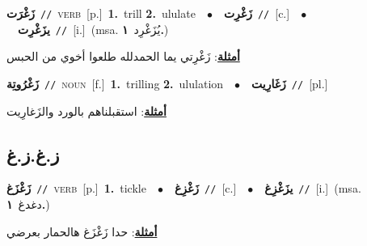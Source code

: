 \documentclass[10pt,a4paper,twoside]{article} %
\begin{document}
\begin{multicols}{2}
{\setlength\topsep{0pt}\textbf{\foreignlanguage{arabic}{زَغْرَت}}\ {\color{gray}\texttt{//}\color{black}}\ \textsc{verb}\ [p.]\ \textbf{1.}~trill  \textbf{2.}~ululate\ \ $\bullet$\ \ \setlength\topsep{0pt}\textbf{\foreignlanguage{arabic}{زَغْرِت}}\ {\color{gray}\texttt{//}\color{black}}\ [c.]\ \ $\bullet$\ \ \setlength\topsep{0pt}\textbf{\foreignlanguage{arabic}{يزَغْرِت}}\ {\color{gray}\texttt{//}\color{black}}\ [i.]\ \color{gray}(msa. \foreignlanguage{arabic}{يُزَغْرِد}~\foreignlanguage{arabic}{\textbf{١.}})\color{black}\  \begin{flushright}\color{gray}\foreignlanguage{arabic}{\textbf{\underline{\foreignlanguage{arabic}{أمثلة}}}: زَغْرِتي يما الحمدلله طلعوا أخوي من الحبس}\end{flushright}\color{black}} \vspace{2mm}

{\setlength\topsep{0pt}\textbf{\foreignlanguage{arabic}{زَغْرُوتِة}}\ {\color{gray}\texttt{//}\color{black}}\ \textsc{noun}\ [f.]\ \textbf{1.}~trilling  \textbf{2.}~ululation\ \ $\bullet$\ \ \setlength\topsep{0pt}\textbf{\foreignlanguage{arabic}{زَغَارِيت}}\ {\color{gray}\texttt{//}\color{black}}\ [pl.]\  \begin{flushright}\color{gray}\foreignlanguage{arabic}{\textbf{\underline{\foreignlanguage{arabic}{أمثلة}}}: استقبلناهم بالورد والزَغارِيت}\end{flushright}\color{black}} \vspace{2mm}

\vspace{-3mm}
\subsection*{\color{blue}\foreignlanguage{arabic}{ز.غ.ز.غ}\color{blue}{}} 

{\setlength\topsep{0pt}\textbf{\foreignlanguage{arabic}{زَغْزَغ}}\ {\color{gray}\texttt{//}\color{black}}\ \textsc{verb}\ [p.]\ \textbf{1.}~tickle\ \ $\bullet$\ \ \setlength\topsep{0pt}\textbf{\foreignlanguage{arabic}{زَغْزِغ}}\ {\color{gray}\texttt{//}\color{black}}\ [c.]\ \ $\bullet$\ \ \setlength\topsep{0pt}\textbf{\foreignlanguage{arabic}{يزَغْزِغ}}\ {\color{gray}\texttt{//}\color{black}}\ [i.]\ \color{gray}(msa. \foreignlanguage{arabic}{دغدغ}~\foreignlanguage{arabic}{\textbf{١.}})\color{black}\  \begin{flushright}\color{gray}\foreignlanguage{arabic}{\textbf{\underline{\foreignlanguage{arabic}{أمثلة}}}: حدا زَغْزَغ هالحمار بعرضي}\end{flushright}\color{black}} \vspace{2mm}


\end{multicols}
\end{document}
